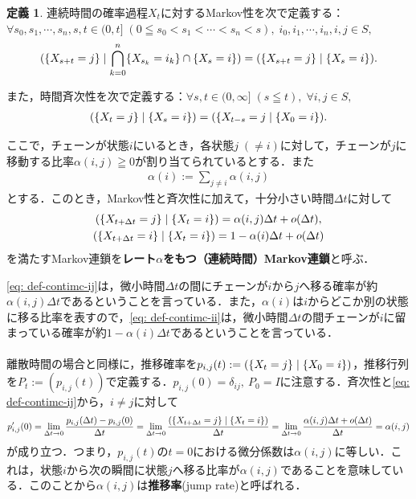\documentclass[dvipdfmx]{jsarticle}
\numberwithin{equation}{section}
\theoremstyle{definition}
\newtheorem{dfn}[thm]{定義}
\let\P\relax
\newcommand{\P}{\mathbb{P}}
\newcommand{\0}{\bm{0}}
\newcommand{\1}{\bm{1}}
\newcommand{\dt}{\Delta t}
\begin{document}
\begin{dfn}
  連続時間の確率過程$X_t$に対するMarkov性を次で定義する：$\forall s_0, s_1, \cdots, s_n, s, t \in (0, t] \; (0 \leqq s_0 < s_1 < \cdots < s_n < s), \; i_0, i_1, \cdots, i_n, i, j \in S,$
  \begin{align}
    \P( \{X_{s+t} = j\} \mid \bigcap_{k=0}^n \{X_{s_k} = i_k\} \cap \{X_s = i\}) = \P(\{X_{s+t} = j\} \mid \{X_s = i\} ).
  \end{align}

  また，時間斉次性を次で定義する：$\forall s, t \in (0, \infty] \; (s \leqq t), \; \forall i, j \in S,$
  \begin{align}
    \P( \{X_t = j\} \mid \{X_s = i\} ) = \P( \{X_{t-s} = j \mid \{X_0 = i\} ).
  \end{align}

  ここで，チェーンが状態$i$にいるとき，各状態$j \; (\ne i)$に対して，チェーンが$j$に移動する比率$\alpha(i, j) \geqq 0$が割り当てられているとする．また
  \begin{align}\label{eq: def-jump rate}
    \alpha(i) := \sum_{j \ne i} \alpha(i, j)
  \end{align}
  とする．このとき，Markov性と斉次性に加えて，十分小さい時間$\dt$に対して
  \begin{gather}
    \P( \{X_{t + \dt} = j\} \mid \{X_t = i\} ) = \alpha(i, j) \dt + o(\dt), \label{eq: def-contimc-ij} \\
    \P( \{X_{t + \dt} = i\} \mid \{X_t = i\} ) = 1 - \alpha(i) \dt + o(\dt) \label{eq: def-contimc-ii}
  \end{gather}
  を満たすMarkov連鎖を{\bf レート$\alpha$をもつ（連続時間）Markov連鎖}と呼ぶ．
\end{dfn}

\eqref{eq: def-contimc-ij}は，微小時間$\dt$の間にチェーンが$i$から$j$へ移る確率が約$\alpha(i,j) \dt$であるということを言っている．また，$\alpha(i)$は$i$からどこか別の状態に移る比率を表すので，\eqref{eq: def-contimc-ii}は，微小時間$\dt$の間チェーンが$i$に留まっている確率が約$1 - \alpha(i) \dt$であるということを言っている．

\paragraph{} 離散時間の場合と同様に，推移確率を$p_{i,j}(t) := \P( \{X_t = j\} \mid \{X_0 = i\} )$，推移行列を$P_t := ( p_{i,j}(t) )$で定義する．$p_{i,j}(0) = \delta_{ij}, ~ P_0 = I$に注意する．斉次性と\eqref{eq: def-contimc-ij}から，$i \ne j$に対して
\begin{align}
  p_{i,j}'(0) = \lim_{\dt \to 0} \frac{p_{i,j}(\dt) - p_{i,j}(0)}{\dt} 
  = \lim_{\dt \to 0} \frac{\P( \{X_{t + \dt} = j\} \mid \{X_t = i\} )}{\dt} 
  = \lim_{\dt \to 0} \frac{\alpha(i,j) \dt + o(\dt)}{\dt} = \alpha(i,j)
\end{align}
が成り立つ．つまり，$p_{i,j}(t)$の$t = 0$における微分係数は$\alpha(i,j)$に等しい．これは，状態$i$から次の瞬間に状態$j$へ移る比率が$\alpha(i,j)$であることを意味している．このことから$\alpha(i,j)$は{\bf 推移率}(jump rate)と呼ばれる．
\end{document}

